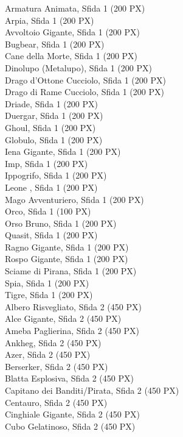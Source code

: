 \begin{multicols}{3}
{Armatura Animata, Sfida 1 (200 PX)\\
Arpia, Sfida 1 (200 PX)\\
Avvoltoio Gigante, Sfida 1 (200 PX)\\
Bugbear, Sfida 1 (200 PX)\\
Cane della Morte, Sfida 1 (200 PX)\\
Dinolupo (Metalupo), Sfida 1 (200 PX)\\
Drago d'Ottone Cucciolo, Sfida 1 (200 PX)\\
Drago di Rame Cucciolo, Sfida 1 (200 PX)\\
Driade, Sfida 1 (200 PX)\\
Duergar, Sfida 1 (200 PX)\\
Ghoul, Sfida 1 (200 PX)\\
Globulo, Sfida 1 (200 PX)\\
Iena Gigante, Sfida 1 (200 PX)\\
Imp, Sfida 1 (200 PX)\\
Ippogrifo, Sfida 1 (200 PX)\\
Leone  , Sfida 1 (200 PX)\\
Mago Avventuriero, Sfida 1 (200 PX)\\
Orco, Sfida 1 (100 PX)\\
Orso Bruno, Sfida 1 (200 PX)\\
Quasit, Sfida 1 (200 PX)\\
Ragno Gigante, Sfida 1 (200 PX)\\
Rospo Gigante, Sfida 1 (200 PX)\\
Sciame di Pirana, Sfida 1 (200 PX)\\
Spia, Sfida 1 (200 PX)\\
Tigre, Sfida 1 (200 PX)\\
Albero Risvegliato, Sfida 2 (450 PX)\\
Alce Gigante, Sfida 2 (450 PX)\\
Ameba Paglierina, Sfida 2 (450 PX)\\
Ankheg, Sfida 2 (450 PX)\\
Azer, Sfida 2 (450 PX)\\
Berserker, Sfida 2 (450 PX)\\
Blatta Esplosiva, Sfida 2 (450 PX)\\
Capitano dei Banditi/Pirata, Sfida 2 (450 PX)\\
Centauro, Sfida 2 (450 PX)\\
Cinghiale Gigante, Sfida 2 (450 PX)\\
Cubo Gelatinoso, Sfida 2 (450 PX)\\
}
\end{multicols}
